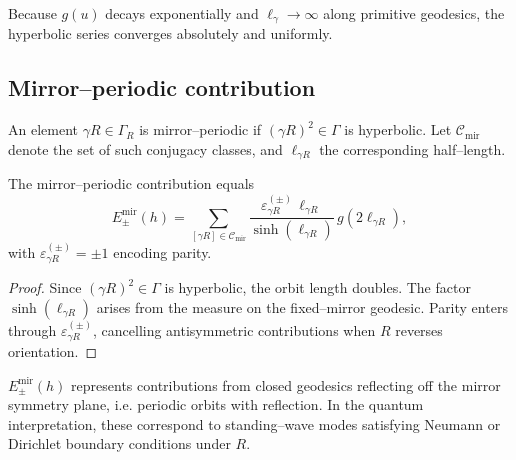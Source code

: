\begin{remark}
\label{rem:hyperbolic-decay}
Because $g(u)$ decays exponentially and $\ell_\gamma\to\infty$ along primitive geodesics, the hyperbolic series converges absolutely and uniformly. %
\end{remark}

\subsection{Mirror–periodic contribution}
\label{subsec:ch6-part5-mirror} \relax

\begin{definition}
\label{def:mirror-class}
An element $\gamma R\in\Gamma_R$ is mirror–periodic if $(\gamma R)^2\in\Gamma$ is hyperbolic.  
Let $\mathcal{C}_{\mathrm{mir}}$ denote the set of such conjugacy classes, and $\ell_{\gamma R}$ the corresponding half–length. %
\end{definition}

\begin{lemma}
\label{lem:mirror-term}
The mirror–periodic contribution equals
\[
E_\pm^{\mathrm{mir}}(h)
=\sum_{[\gamma R]\in\mathcal{C}_{\mathrm{mir}}}
\frac{\varepsilon_{\gamma R}^{(\pm)}\,\ell_{\gamma R}}{\sinh(\ell_{\gamma R})}\,g(2\ell_{\gamma R}),
\]
with $\varepsilon_{\gamma R}^{(\pm)}=\pm1$ encoding parity. %
\end{lemma}

\begin{proof}
Since $(\gamma R)^2\in\Gamma$ is hyperbolic, the orbit length doubles.  
The factor $\sinh(\ell_{\gamma R})$ arises from the measure on the fixed–mirror geodesic.  
Parity enters through $\varepsilon_{\gamma R}^{(\pm)}$, cancelling antisymmetric contributions when $R$ reverses orientation. %
\end{proof}

\begin{remark}
\label{rem:mirror-phys}
$E_\pm^{\mathrm{mir}}(h)$ represents contributions from closed geodesics reflecting off the mirror symmetry plane, i.e. periodic orbits with reflection.  
In the quantum interpretation, these correspond to standing–wave modes satisfying Neumann or Dirichlet boundary conditions under $R$. %
\end{remark}

